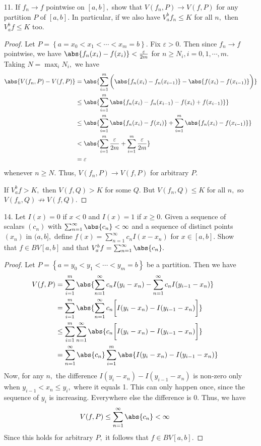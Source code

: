 \documentclass{article}
\begin{document}
\begin{itemize}
	\item[11.] If $f_n\to f$ pointwise on $[a, b],$ show that $V(f_n, P)\to V(f, P)$ for any partition $P$ of $[a, b].$ In particular, if we also have $V_a^b f_n \le K$ for all $n,$ then $V_a^b f\le K$ too.
		\begin{proof}
			Let $P=\left\{ a=x_0<x_1<\cdots<x_m=b \right\}.$ Fix $\varepsilon>0.$ Then since $f_n\to f$ pointwise, we have $\abs{f_n(x_i)-f(x_i)}<\frac{\varepsilon}{2m}$ for $n\ge N_i, i=0, 1, \cdots, m.$ Taking $N=\max_i N_i,$ we have
			\begin{align*}
				\abs{V(f_n, P)-V(f, P)} &= \abs{\sum_{i=1}^{m} \bigg( \abs{f_n(x_i)-f_n(x_{i-1})} - \abs{f(x_i) - f(x_{i-1})} \bigg)} \\
				&\le \abs{\sum_{i=1}^{m} \abs{f_n(x_i)-f_n(x_{i-1}) - f(x_i) + f(x_{i-1})}} \\
				&\le \abs{\sum_{i=1}^{m} \abs{f_n(x_i)-f(x_i)} + \sum_{i=1}^{m} \abs{f_n(x_i) - f(x_{i-1})}} \\
				&< \abs{\sum_{i=1}^{m} \frac{\varepsilon}{2m} + \sum_{i=1}^{m} \frac{\varepsilon}{2m}} \\
				&= \varepsilon
			\end{align*}
			whenever $n\ge N.$ Thus, $V(f_n, P)\to V(f, P)$ for arbitrary $P.$

			If $V_a^b f>K,$ then $V(f, Q)>K$ for some $Q.$ But $V(f_n, Q)\le K$ for all $n,$ so $V(f_n, Q)\not\to V(f, Q).$
		\end{proof}

	\item[14.] Let $I(x)=0$ if $x<0$ and $I(x)=1$ if $x\ge 0.$ Given a sequence of scalars $(c_n)$ with $\sum_{n=1}^{\infty}\abs{c_n}<\infty$ and a sequence of distinct points $(x_n)$ in $(a, b],$ define $f(x)=\sum_{n=1}^{\infty} c_nI(x-x_n)$ for $x\in[a, b].$ Show that $f\in BV[a, b]$ and that $V_a^bf=\sum_{n=1}^{\infty} \abs{c_n}.$
		\begin{proof}
			Let $P=\left\{ a=y_0<y_1<\cdots<y_m=b \right\}$ be a partition. Then we have
			\begin{align*}
				V(f, P) &= \sum_{i=1}^{m} \abs{\sum_{n=1}^{\infty} c_n I(y_i-x_n) - \sum_{n=1}^{\infty} c_nI(y_{i-1}-x_n)} \\
				&= \sum_{i=1}^{m} \abs{\sum_{n=1}^{\infty} c_n\bigg[ I(y_i-x_n) - I(y_{i-1}-x_n)\bigg]} \\ 
				&\le \sum_{i=1}^{m} \sum_{n=1}^{\infty} \abs{c_n\bigg[I(y_i-x_n)-I(y_{i-1}-x_n)\bigg]} \\
				&= \sum_{n=1}^{\infty} \abs{c_n}\sum_{i=1}^{m} \abs{I(y_i-x_n)-I(y_{i-1}-x_n)}
			\end{align*}
			Now, for any $n,$ the difference $I(y_i-x_n)-I(y_{i-1}-x_n)$ is non-zero only when $y_{i-1}<x_n\le y_i,$ where it equals 1. This can only happen once, since the sequence of $y_i$ is increasing. Everywhere else the difference is 0. Thus, we have
			\begin{align*}
				V(f, P)\le \sum_{n=1}^{\infty} \abs{c_n} < \infty
			\end{align*}
			Since this holds for arbitrary $P,$ it follows that $f\in BV[a, b].$


\end{proof}
\end{itemize}
\end{document}
